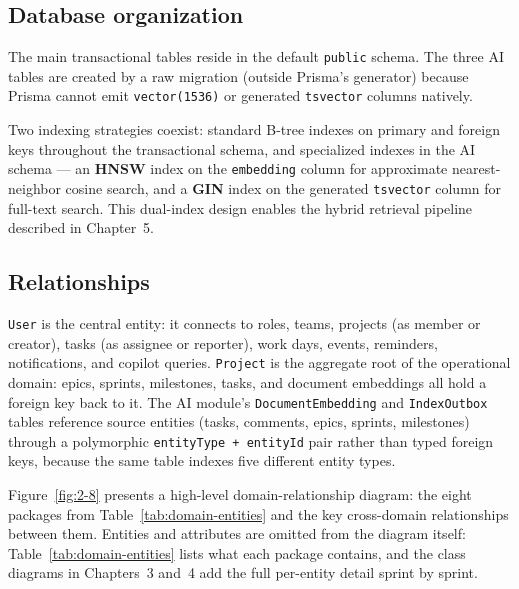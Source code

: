 \subsection{Database organization}

The main transactional tables reside in the default \texttt{public} schema. The three AI tables
are created by a raw migration (outside Prisma's generator) because Prisma cannot emit
\texttt{vector(1536)} or generated \texttt{tsvector} columns natively.

Two indexing strategies coexist: standard B-tree indexes on primary and foreign keys throughout
the transactional schema, and specialized indexes in the AI schema --- an \textbf{HNSW} index on
the \texttt{embedding} column for approximate nearest-neighbor cosine search, and a \textbf{GIN}
index on the generated \texttt{tsvector} column for full-text search. This dual-index design
enables the hybrid retrieval pipeline described in Chapter~5.

\subsection{Relationships}

\texttt{User} is the central entity: it connects to roles, teams, projects (as member or
creator), tasks (as assignee or reporter), work days, events, reminders, notifications, and
copilot queries. \texttt{Project} is the aggregate root of the operational domain: epics,
sprints, milestones, tasks, and document embeddings all hold a foreign key back to it. The AI module's
\texttt{DocumentEmbedding} and \texttt{IndexOutbox} tables reference source entities (tasks,
comments, epics, sprints, milestones) through a polymorphic \texttt{entityType + entityId} pair
rather than typed foreign keys, because the same table indexes five different entity types.

Figure~\ref{fig:2-8} presents a high-level domain-relationship diagram: the eight packages
from Table~\ref{tab:domain-entities} and the key cross-domain relationships between them.
Entities and attributes are omitted from the diagram itself: Table~\ref{tab:domain-entities}
lists what each package contains, and the class diagrams in Chapters~3 and~4 add the full per-entity
detail sprint by sprint.

{\renewcommand{\figmaxheight}{0.55\textheight}%
}

